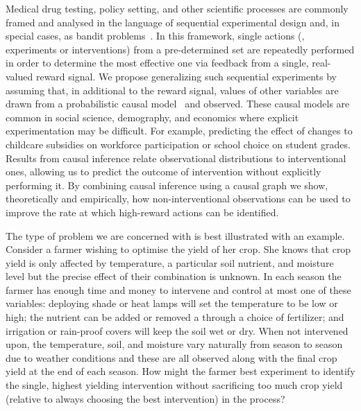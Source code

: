 Medical drug testing, policy setting, and other scientific processes are commonly framed and analysed in the language of sequential experimental design and, in special cases, as bandit problems~\citep{Robbins1952,Chernoff1959}. 
In this framework, single actions (\eg, experiments or interventions) from a pre-determined set are repeatedly performed in order to determine the most effective one via feedback from a single, real-valued reward signal. 
We propose generalizing such sequential experiments by assuming that, in additional to the reward signal, values of other variables are drawn from a probabilistic causal model~\citep{Pearl2000} and observed.
These causal models are common in social science, demography, and economics where explicit experimentation may be difficult. 
For example, predicting the effect of changes to childcare subsidies on workforce participation or school choice on student grades. 
Results from causal inference relate observational distributions to interventional ones, allowing us to predict the outcome of intervention without explicitly performing it. 
By combining causal inference using a causal graph we show, theoretically and empirically, how non-interventional observations can be used to improve the rate at which high-reward actions can be identified.


The type of problem we are concerned with is best illustrated with an example. 
Consider a farmer wishing to optimise the yield of her crop. 
She knows that crop yield is only affected by temperature, a particular soil nutrient, and moisture level but the precise effect of their combination is unknown.
In each season the farmer has enough time and money to intervene and control at most one of these variables:
deploying shade or heat lamps will set the temperature to be low or high; the nutrient can be added or removed a through a choice of fertilizer; and irrigation or rain-proof covers will keep the soil wet or dry.
When not intervened upon, the temperature, soil, and moisture vary naturally from season to season due to weather conditions and these are all observed along with the final crop yield at the end of each season.
How might the farmer best experiment to identify the single, highest yielding intervention without sacrificing too much crop yield (relative to always choosing the best intervention) in the process?


